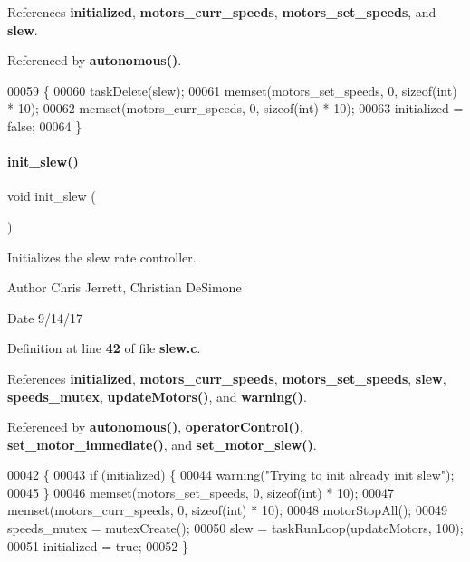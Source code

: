 References \textbf{ initialized}, \textbf{ motors\+\_\+curr\+\_\+speeds}, \textbf{ motors\+\_\+set\+\_\+speeds}, and \textbf{ slew}.



Referenced by \textbf{ autonomous()}.


\begin{DoxyCode}
00059                   \{
00060   taskDelete(slew);
00061   memset(motors_set_speeds, 0, \textcolor{keyword}{sizeof}(\textcolor{keywordtype}{int}) * 10);
00062   memset(motors_curr_speeds, 0, \textcolor{keyword}{sizeof}(\textcolor{keywordtype}{int}) * 10);
00063   initialized = \textcolor{keyword}{false};
00064 \}
\end{DoxyCode}
\mbox{\label{a00065_a321758941d88b75783955c819bb75005}} 
\paragraph{init\+\_\+slew()}
{\footnotesize\ttfamily void init\+\_\+slew (\begin{DoxyParamCaption}{ }\end{DoxyParamCaption})}



Initializes the slew rate controller. 

\begin{DoxyAuthor}{Author}
Chris Jerrett, Christian De\+Simone 
\end{DoxyAuthor}
\begin{DoxyDate}{Date}
9/14/17 
\end{DoxyDate}


Definition at line \textbf{ 42} of file \textbf{ slew.\+c}.



References \textbf{ initialized}, \textbf{ motors\+\_\+curr\+\_\+speeds}, \textbf{ motors\+\_\+set\+\_\+speeds}, \textbf{ slew}, \textbf{ speeds\+\_\+mutex}, \textbf{ update\+Motors()}, and \textbf{ warning()}.



Referenced by \textbf{ autonomous()}, \textbf{ operator\+Control()}, \textbf{ set\+\_\+motor\+\_\+immediate()}, and \textbf{ set\+\_\+motor\+\_\+slew()}.


\begin{DoxyCode}
00042                  \{
00043   \textcolor{keywordflow}{if} (initialized) \{
00044     warning(\textcolor{stringliteral}{"Trying to init already init slew"});
00045   \}
00046   memset(motors_set_speeds, 0, \textcolor{keyword}{sizeof}(\textcolor{keywordtype}{int}) * 10);
00047   memset(motors_curr_speeds, 0, \textcolor{keyword}{sizeof}(\textcolor{keywordtype}{int}) * 10);
00048   motorStopAll();
00049   speeds_mutex = mutexCreate();
00050   slew = taskRunLoop(updateMotors, 100);
00051   initialized = \textcolor{keyword}{true};
00052 \}
\end{DoxyCode}
\mbox{\label{a00065_a9f8b8ae577ef938622024545711f0151}} 
